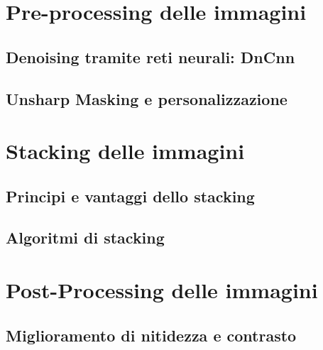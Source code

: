 \section{Pre-processing delle immagini} \label{sec:preprocessing}

\subsection{Denoising tramite reti neurali: DnCnn} \label{subsec:denoising}

\subsection{Unsharp Masking e personalizzazione} \label{subsec:unsharp_mask}

\section{Stacking delle immagini} \label{sec:stacking}

\subsection{Principi e vantaggi dello stacking} \label{subsec:stacking_intro}

\subsection{Algoritmi di stacking} \label{subsec:atacking_algo}

\section{Post-Processing delle immagini} \label{sec:postprocess}

\subsection{Miglioramento di nitidezza e contrasto} \label{subsec:contrast}

\cleardoublepage